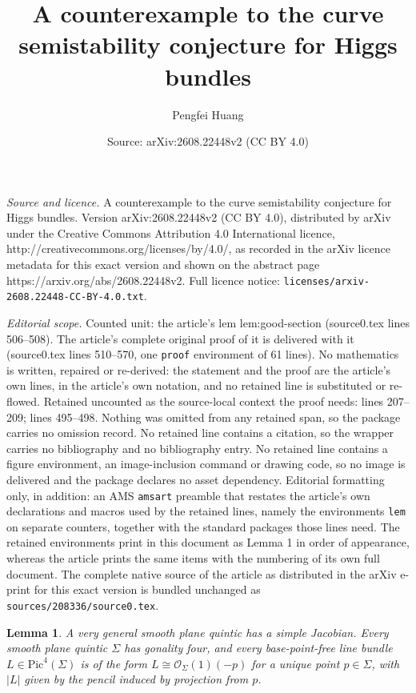 \documentclass[10pt,a4paper]{amsart}
\title{A counterexample to the curve semistability conjecture for Higgs bundles}
\author{Pengfei Huang}
\date{Source: arXiv:2608.22448v2 (CC BY 4.0)}
\newtheorem{lem}{Lemma}
\begin{document}
\maketitle

\noindent\emph{Source and licence.} A counterexample to the curve semistability conjecture for Higgs bundles. Version arXiv:2608.22448v2 (CC BY 4.0), distributed by arXiv under the Creative Commons Attribution 4.0 International licence, http://creativecommons.org/licenses/by/4.0/, as recorded in the arXiv licence metadata for this exact version and shown on the abstract page https://arxiv.org/abs/2608.22448v2. Full licence notice: \texttt{licenses/arxiv-2608.22448-CC-BY-4.0.txt}.\par\smallskip

\noindent\textit{Editorial scope.} Counted unit: the article's lem lem:good-section (source0.tex lines 506--508). The article's complete original proof of it is delivered with it (source0.tex lines 510--570, one \texttt{proof} environment of 61 lines). No mathematics is written, repaired or re-derived: the statement and the proof are the article's own lines, in the article's own notation, and no retained line is substituted or re-flowed.  Retained uncounted as the source-local context the proof needs: lines 207--209; lines 495--498.  Nothing was omitted from any retained span, so the package carries no omission record.  No retained line contains a citation, so the wrapper carries no bibliography and no bibliography entry.  No retained line contains a figure environment, an image-inclusion command or drawing code, so no image is delivered and the package declares no asset dependency.  Editorial formatting only, in addition: an AMS \texttt{amsart} preamble that restates the article's own declarations and macros used by the retained lines, namely the environments \texttt{lem} on separate counters, together with the standard packages those lines need.  The retained environments print in this document as Lemma 1 in order of appearance, whereas the article prints the same items with the numbering of its own full document.  The complete native source of the article as distributed in the arXiv e-print for this exact version is bundled unchanged as \texttt{sources/208336/source0.tex}.
\begin{lem}\label{lem:plane-quintic}
A very general smooth plane quintic has a simple Jacobian.  Every smooth plane quintic $\Sigma$ has gonality four, and every base-point-free line bundle $L\in\mathrm{Pic}^4(\Sigma)$ is of the form $L\cong\mathcal{O}_\Sigma(1)(-p)$ for a unique point $p\in\Sigma$, with $|L|$ given by the pencil induced by projection from $p$.
\end{lem}
\end{document}
